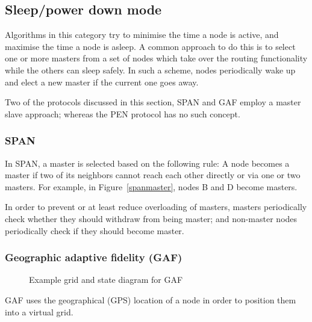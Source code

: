 \subsection{Sleep/power­ down mode}\label{sleep}
Algorithms in this category try to minimise the time a node is active, and
maximise the time a node is asleep. A common approach to do this is to select
one or more masters from a set of nodes which take over the routing functionality
while the others can sleep safely. In such a scheme, nodes periodically wake up
and elect a new master if the current one goes away.

Two of the protocols discussed in this section, SPAN and GAF employ a master
slave approach; whereas the PEN protocol has no such concept.

\subsubsection{SPAN}\label{span}
In SPAN\cite{chen2002span}, a master is selected based on the following rule:
A node becomes a master if two of its neighbors cannot reach each other directly
or via one or two masters. For example, in Figure~\ref{spanmaster}, nodes B and
D become masters.

In order to prevent or at least reduce overloading of masters, masters periodically
check whether they should withdraw from being master; and non-master nodes
periodically check if they should become master.


\subsubsection{Geographic adaptive fidelity (GAF)}
\label{gaf}
\begin{figure}[!t]
\hfill
{}
\caption{Example grid and state diagram for GAF\cite{alotaibi2012survey}}
\end{figure}
GAF\cite{xu2001geography} uses the geographical (GPS) location of a node in
order to position them into a virtual grid.

